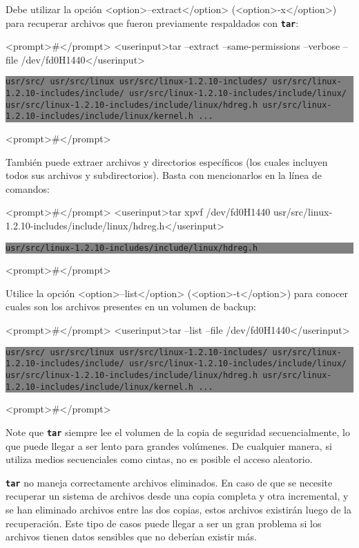 	

Debe utilizar la opción  <option>--extract</option> (<option>-x</option>) para recuperar archivos que fueron 
previamente respaldados con \texttt{\textbf{tar}}:


<prompt>#</prompt> <userinput>tar --extract --same-permissions 
--verbose --file 
/dev/fd0H1440</userinput>
\colorbox{grey}{\parbox[t]{0.95\linewidth}{ \vspace*{0.5cm} {\tt usr/src/
usr/src/linux
usr/src/linux-1.2.10-includes/
usr/src/linux-1.2.10-includes/include/
usr/src/linux-1.2.10-includes/include/linux/
usr/src/linux-1.2.10-includes/include/linux/hdreg.h
usr/src/linux-1.2.10-includes/include/linux/kernel.h
... } \vspace*{0.5cm} } } 
<prompt>#</prompt>



También puede extraer archivos y directorios específicos (los cuales incluyen 
todos sus archivos y subdirectorios). Basta con mencionarlos en la línea de comandos:


<prompt>#</prompt> <userinput>tar xpvf /dev/fd0H1440 
usr/src/linux-1.2.10-includes/include/linux/hdreg.h</userinput>
\colorbox{grey}{\parbox[t]{0.95\linewidth}{ \vspace*{0.5cm} {\tt usr/src/linux-1.2.10-includes/include/linux/hdreg.h } \vspace*{0.5cm} } } 
<prompt>#</prompt>



Utilice la opción <option>--list</option> (<option>-t</option>) para conocer cuales son los archivos presentes en un 
volumen de backup:


<prompt>#</prompt> <userinput>tar --list --file 
/dev/fd0H1440</userinput>
\colorbox{grey}{\parbox[t]{0.95\linewidth}{ \vspace*{0.5cm} {\tt usr/src/
usr/src/linux
usr/src/linux-1.2.10-includes/
usr/src/linux-1.2.10-includes/include/
usr/src/linux-1.2.10-includes/include/linux/
usr/src/linux-1.2.10-includes/include/linux/hdreg.h
usr/src/linux-1.2.10-includes/include/linux/kernel.h
... } \vspace*{0.5cm} } } 
<prompt>#</prompt>



Note que \texttt{\textbf{tar}} siempre lee el volumen de la copia de seguridad secuencialmente, 
lo que puede llegar a ser lento para grandes volúmenes. 
De cualquier manera, si utiliza medios secuenciales como cintas, no 
es posible el acceso aleatorio.
	
	 \texttt{\textbf{tar}}
no maneja correctamente archivos eliminados. En caso de que se necesite recuperar un 
sistema de archivos desde una copia completa y otra incremental, y se han 
eliminado archivos entre las dos copias, estos archivos existirán luego de
la recuperación. Este tipo de casos puede llegar a ser un gran problema si los archivos 
tienen datos sensibles que no deberían existir más.





